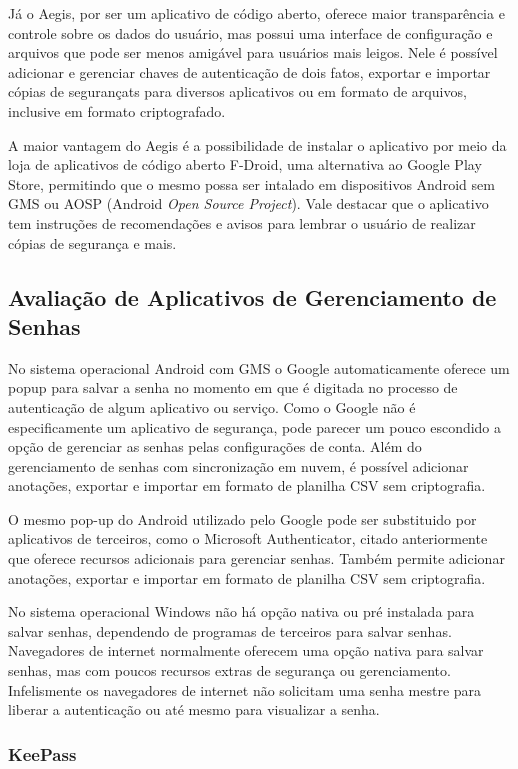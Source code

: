 \documentclass[12pt]{article}
\begin{document}
Já o Aegis, por ser um aplicativo de código aberto, oferece maior transparência
e controle sobre os dados do usuário, mas possui uma interface de configuração
e arquivos que pode ser menos amigável para usuários mais leigos.
Nele é possível adicionar e gerenciar chaves de autenticação de dois fatos,
exportar e importar cópias de segurançats para diversos aplicativos ou em formato de arquivos,
inclusive em formato criptografado.

A maior vantagem do Aegis é a possibilidade de instalar o aplicativo por meio da
loja de aplicativos de código aberto F-Droid, uma alternativa ao Google Play
Store, permitindo que o mesmo possa ser intalado em dispositivos Android sem GMS
ou AOSP (Android \textit{Open Source Project}).
Vale destacar que o aplicativo tem instruções de recomendações e avisos para lembrar o usuário
de realizar cópias de segurança e mais.

\subsection{Avaliação de Aplicativos de Gerenciamento de Senhas}

No sistema operacional Android com GMS o Google automaticamente oferece um popup
para salvar a senha no momento em que é digitada no processo de autenticação de
algum aplicativo ou serviço.
Como o Google não é especificamente um aplicativo de segurança, pode parecer um
pouco escondido a opção de gerenciar as senhas pelas configurações de conta.
Além do gerenciamento de senhas com sincronização em nuvem, é possível adicionar
anotações, exportar e importar em formato de planilha CSV sem criptografia.

O mesmo pop-up do Android utilizado pelo Google pode ser substituido por
aplicativos de terceiros, como o Microsoft Authenticator, citado anteriormente
que oferece recursos adicionais para gerenciar senhas.
Também permite adicionar anotações, exportar e importar em formato de planilha
CSV sem criptografia.

No sistema operacional Windows não há opção nativa ou pré instalada para
salvar senhas, dependendo de programas de terceiros para salvar senhas.
Navegadores de internet normalmente oferecem uma opção nativa para salvar senhas,
mas com poucos recursos extras de segurança ou gerenciamento.
Infelismente os navegadores de internet não solicitam uma senha mestre para liberar
a autenticação ou até mesmo para visualizar a senha.

\subsubsection{KeePass}
\end{document}
